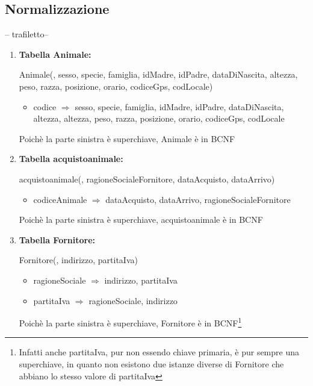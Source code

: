 \documentclass[12pt,a4paper]{article}
\begin{document}
   
   
\subsection{Normalizzazione}
-- trafiletto--
\begin{enumerate}



\item[] \textbf{Tabella Animale:}

Animale(\underline{}, sesso, specie, famiglia, idMadre, idPadre, dataDiNascita, altezza, peso, razza, posizione, orario,  codiceGps,  codLocale)
\begin{itemize}
\vspace{-5pt}
\item codice $\Rightarrow$ sesso, specie, famiglia, idMadre, idPadre, dataDiNascita, altezza, altezza, peso, razza, posizione, orario, codiceGps, codLocale
\vspace{-5pt}
\end{itemize}
Poichè la parte sinistra è superchiave, Animale è in BCNF
\vspace{10pt}



\item[] \textbf{Tabella acquistoanimale:}

acquistoanimale(\underline{}, ragioneSocialeFornitore,  dataAcquisto,  dataArrivo)
\begin{itemize}
\vspace{-5pt}
\item codiceAnimale $\Rightarrow$ dataAcquisto, dataArrivo, ragioneSocialeFornitore
\vspace{-5pt}
\end{itemize}
Poichè la parte sinistra è superchiave, acquistoanimale è in BCNF
\vspace{10pt}



\item[] \textbf{Tabella Fornitore:}

Fornitore(\underline{}, indirizzo, partitaIva)
\begin{itemize}
\vspace{-5pt}
\item ragioneSociale $\Rightarrow$ indirizzo, partitaIva
\item partitaIva $\Rightarrow$ ragioneSociale, indirizzo
\vspace{-5pt}
\end{itemize}
Poichè la parte sinistra è superchiave, Fornitore è in BCNF\footnote{Infatti anche partitaIva, pur non essendo chiave primaria, è pur sempre una superchiave, in quanto non esistono due  istanze diverse di Fornitore che abbiano lo stesso valore di partitaIva}
\vspace{10pt}




\end{enumerate}
\end{document}
